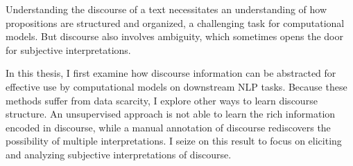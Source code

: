 Understanding the discourse of a text necessitates an understanding of how propositions are structured and organized, a challenging task for computational models. But discourse also involves ambiguity, which sometimes opens the door for subjective interpretations.

In this thesis, I first examine how discourse information can be abstracted for effective use by computational models on downstream NLP tasks. Because these methods suffer from data scarcity, I explore other ways to learn discourse structure. An unsupervised approach is not able to learn the rich information encoded in discourse, while a manual annotation of discourse rediscovers the possibility of multiple interpretations. I seize on this result to focus on eliciting and analyzing subjective interpretations of discourse.
